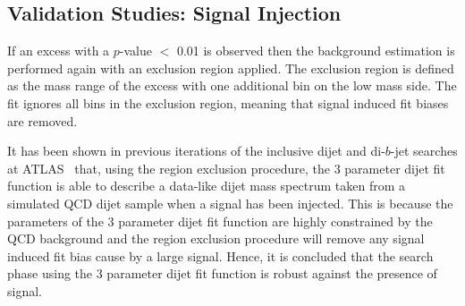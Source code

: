 
\subsection{Validation Studies: Signal Injection}
\label{sec:bkg-summer_sigInj}

If an excess with a  \bh{} $p$-value $<$ 0.01 is observed then the background estimation is
performed again with an exclusion region applied.
The exclusion region is defined as the mass range of the excess with one additional bin on the low mass side.
The fit ignores all bins in the exclusion region, meaning that signal induced fit biases are removed.

It has been shown in previous iterations of the inclusive dijet and di-$b$-jet searches at ATLAS~\cite{dijet-mori16_paper,dibjet-mori16_paper} that,
using the region exclusion procedure, the 3 parameter dijet fit function is able to describe a data-like dijet mass spectrum
taken from a simulated QCD dijet sample when a signal has been injected.
This is because the parameters of the 3 parameter dijet fit function are highly constrained by the QCD background
and the region exclusion procedure will remove any signal induced fit bias cause by a large signal.
Hence, it is concluded that the search phase using the 3 parameter dijet fit function is robust against the presence of signal.


